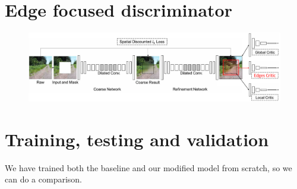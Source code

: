 \documentclass[a4paper, 11pt]{article}
\begin{document}
\section{Edge focused discriminator}
\label{section:edgeDiscriminator}
    \begin{figure}
        \centering
        \includegraphics[width=0.95\linewidth]{documentation/img/new_arch.png}
    \end{figure}

\section{Training, testing and validation}
\label{section:training}
We have trained both the baseline and our modified model from scratch, so we can do a comparison.
\end{document}
